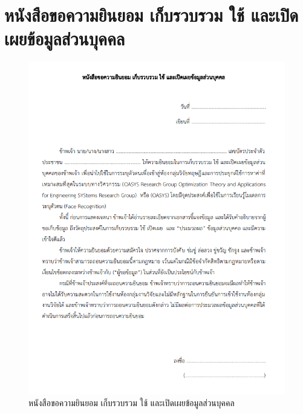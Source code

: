 \section{หนังสือขอความยินยอม เก็บรวบรวม ใช้ และเปิดเผยข้อมูลส่วนบุคคล}
\begin{figure}[!ht]
  \begin{center}
    \includegraphics[scale=.85]{pic/PDPA.png}
    \caption[หนังสือขอความยินยอม เก็บรวบรวม ใช้ และเปิดเผยข้อมูลส่วนบุคคล]{หนังสือขอความยินยอม เก็บรวบรวม ใช้ และเปิดเผยข้อมูลส่วนบุคคล}
    \label{fig:pdpa}
  \end{center}
\end{figure}
